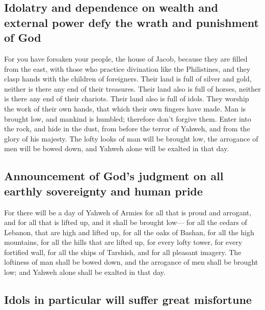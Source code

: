\hypertarget{idolatry-and-dependence-on-wealth-and-external-power-defy-the-wrath-and-punishment-of-god}{%
\subsection{Idolatry and dependence on wealth and external power defy
the wrath and punishment of
God}\label{idolatry-and-dependence-on-wealth-and-external-power-defy-the-wrath-and-punishment-of-god}}

 For you have forsaken your people, the house of Jacob,
because they are filled from the east, with those who practice
divination like the Philistines, and they clasp hands with the children
of foreigners.  Their land is full of silver and gold,
neither is there any end of their treasures. Their land also is full of
horses, neither is there any end of their chariots.  Their
land also is full of idols. They worship the work of their own hands,
that which their own fingers have made.  Man is brought
low, and mankind is humbled; therefore don't forgive them.
 Enter into the rock, and hide in the dust, from before
the terror of Yahweh, and from the glory of his majesty. 
The lofty looks of man will be brought low, the arrogance of men will be
bowed down, and Yahweh alone will be exalted in that day.

\hypertarget{announcement-of-gods-judgment-on-all-earthly-sovereignty-and-human-pride}{%
\subsection{Announcement of God's judgment on all earthly sovereignty
and human
pride}\label{announcement-of-gods-judgment-on-all-earthly-sovereignty-and-human-pride}}

 For there will be a day of Yahweh of Armies for all that
is proud and arrogant, and for all that is lifted up, and it shall be
brought low---  for all the cedars of Lebanon, that are
high and lifted up, for all the oaks of Bashan,  for all
the high mountains, for all the hills that are lifted up,
 for every lofty tower, for every fortified wall,
 for all the ships of Tarshish, and for all pleasant
imagery.  The loftiness of man shall be bowed down, and
the arrogance of men shall be brought low; and Yahweh alone shall be
exalted in that day.

\hypertarget{idols-in-particular-will-suffer-great-misfortune}{%
\subsection{Idols in particular will suffer great
misfortune}\label{idols-in-particular-will-suffer-great-misfortune}}

